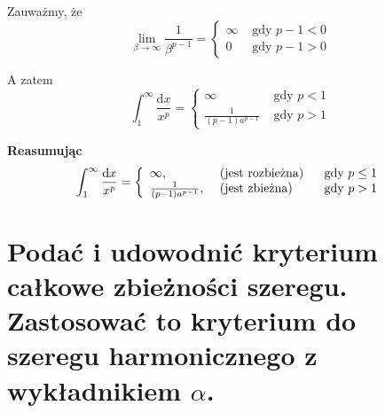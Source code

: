 \documentclass{article}
\theoremstyle{definition}
\theoremstyle{case}
\begin{document}
Zauważmy, że
\begin{equation*}
	\lim_{\beta \to \infty} \frac{1}{\beta^{p-1}}
	= \left\{
		\begin{array}{ll}
			\infty & \text{ gdy } p-1< 0
			\\ 0 & \text{ gdy } p-1> 0
		\end{array}
	\right.
\end{equation*}

A zatem
\begin{equation*}
	\int_1^\infty \frac{\mathrm d x}{x^p}
	= \left\{
		\begin{array}{ll}
			\infty & \text{ gdy } p< 1
			\\ \frac{1}{(p-1)a^{p-1}} & \text{ gdy } p> 1
		\end{array}
	\right.
\end{equation*}

\textbf{Reasumując}
\begin{equation*}
\int_1^\infty \frac{\mathrm d x}{x^p}
= \left\{
	\begin{array}{lll}
		\infty, & \textnormal{ (jest rozbieżna) } & \text{ gdy } p\leq1
		\\ \frac{1}{(p-1)a^{p-1}}, & \textnormal{ (jest zbieżna) } & \text{ gdy } p>1
	\end{array}
\right.
\end{equation*}

\section{Podać i udowodnić kryterium całkowe zbieżności szeregu.
	Zastosować to kryterium do szeregu harmonicznego z wykładnikiem
	\texorpdfstring{$ \alpha $}{a}.}
\end{document}

